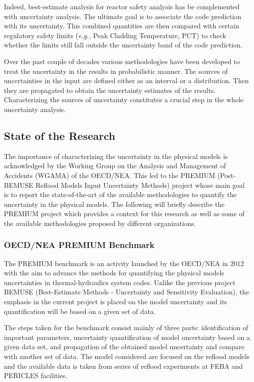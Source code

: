\documentclass[11pt,titlepage]{article}
\begin{document}
Indeed, best-estimate analysis for reactor safety analysis has be complemented with uncertainty analysis. 
The ultimate goal is to associate the code prediction with its uncertainty. 
This combined quantities are then compared with certain regulatory safety limits (\textit{e.g.,} Peak Cladding Temperature, PCT) to check whether the limits still fall outside the uncertainty band of the code prediction.
 
Over the past couple of decades various methodologies have been developed to treat the uncertainty in the results in probabilistic manner. 
The sources of uncertainties in the input are defined either as an interval or a distribution. 
Then they are propagated to obtain the uncertainty estimates of the results. 
Characterizing the sources of uncertainty constitutes a crucial step in the whole uncertainty analysis.   

\subsection{State of the Research}

The importance of characterizing the uncertainty in the physical models is acknowledged by the Working Group on the Analysis and Management of Accidents (WGAMA) of the OECD/NEA. 
This led to the PREMIUM (Post-BEMUSE Reflood Models Input Uncertainty Methods) project whose main goal is to report the state-of-the-art of the available methodologies to quantify the uncertainty in the physical models. 
The following will briefly describe the PREMIUM project which provides a context for this research as well as some of the available methodologies proposed by different organizations.

\subsubsection{OECD/NEA PREMIUM Benchmark}

The PREMIUM benchmark is an activity launched by the OECD/NEA in 2012 with the aim to advance the methods for quantifying the physical models uncertainties in thermal-hydraulics system codes. 
Unlike the previous project BEMUSE (Best-Estimate Methods - Uncertainty and Sensitivity Evaluation), 
the emphasis in the current project is placed on the model uncertainty and its quantification will be based on a given set of data.

The steps taken for the benchmark consist mainly of three parts: identification of important parameters, uncertainty quantification of model uncertainty based on a given data set, and propagation of the obtained model uncertainty and compare with another set of data. 
The model considered are focused on the reflood models and the available data is taken from series of reflood experiments at FEBA and PERICLES facilities.
\end{document}
